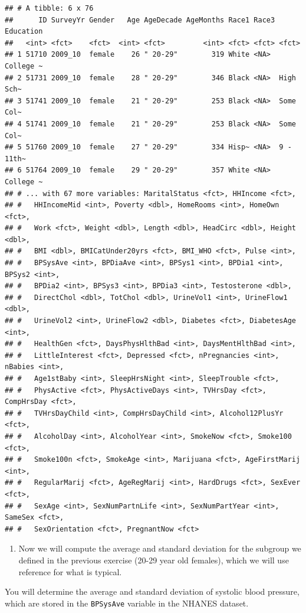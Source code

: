 \documentclass[
]{article}
\providecommand{\tightlist}{%
  \setlength{\itemsep}{0pt}\setlength{\parskip}{0pt}}
\begin{document}
\begin{verbatim}
## # A tibble: 6 x 76
##      ID SurveyYr Gender   Age AgeDecade AgeMonths Race1 Race3 Education
##   <int> <fct>    <fct>  <int> <fct>         <int> <fct> <fct> <fct>    
## 1 51710 2009_10  female    26 " 20-29"        319 White <NA>  College ~
## 2 51731 2009_10  female    28 " 20-29"        346 Black <NA>  High Sch~
## 3 51741 2009_10  female    21 " 20-29"        253 Black <NA>  Some Col~
## 4 51741 2009_10  female    21 " 20-29"        253 Black <NA>  Some Col~
## 5 51760 2009_10  female    27 " 20-29"        334 Hisp~ <NA>  9 - 11th~
## 6 51764 2009_10  female    29 " 20-29"        357 White <NA>  College ~
## # ... with 67 more variables: MaritalStatus <fct>, HHIncome <fct>,
## #   HHIncomeMid <int>, Poverty <dbl>, HomeRooms <int>, HomeOwn <fct>,
## #   Work <fct>, Weight <dbl>, Length <dbl>, HeadCirc <dbl>, Height <dbl>,
## #   BMI <dbl>, BMICatUnder20yrs <fct>, BMI_WHO <fct>, Pulse <int>,
## #   BPSysAve <int>, BPDiaAve <int>, BPSys1 <int>, BPDia1 <int>, BPSys2 <int>,
## #   BPDia2 <int>, BPSys3 <int>, BPDia3 <int>, Testosterone <dbl>,
## #   DirectChol <dbl>, TotChol <dbl>, UrineVol1 <int>, UrineFlow1 <dbl>,
## #   UrineVol2 <int>, UrineFlow2 <dbl>, Diabetes <fct>, DiabetesAge <int>,
## #   HealthGen <fct>, DaysPhysHlthBad <int>, DaysMentHlthBad <int>,
## #   LittleInterest <fct>, Depressed <fct>, nPregnancies <int>, nBabies <int>,
## #   Age1stBaby <int>, SleepHrsNight <int>, SleepTrouble <fct>,
## #   PhysActive <fct>, PhysActiveDays <int>, TVHrsDay <fct>, CompHrsDay <fct>,
## #   TVHrsDayChild <int>, CompHrsDayChild <int>, Alcohol12PlusYr <fct>,
## #   AlcoholDay <int>, AlcoholYear <int>, SmokeNow <fct>, Smoke100 <fct>,
## #   Smoke100n <fct>, SmokeAge <int>, Marijuana <fct>, AgeFirstMarij <int>,
## #   RegularMarij <fct>, AgeRegMarij <int>, HardDrugs <fct>, SexEver <fct>,
## #   SexAge <int>, SexNumPartnLife <int>, SexNumPartYear <int>, SameSex <fct>,
## #   SexOrientation <fct>, PregnantNow <fct>
\end{verbatim}

\begin{enumerate}
\def\labelenumi{\arabic{enumi}.}
\setcounter{enumi}{1}
\tightlist
\item
  Now we will compute the average and standard deviation for the
  subgroup we defined in the previous exercise (20-29 year old females),
  which we will use reference for what is typical.
\end{enumerate}

You will determine the average and standard deviation of systolic blood
pressure, which are stored in the \texttt{BPSysAve} variable in the
NHANES dataset.
\end{document}
